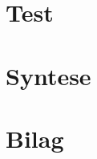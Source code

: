 \chapter{Test}


\chapter{Syntese}

%

\begingroup
\raggedright



%
%

\endgroup

\appendix
\chapter{Bilag}



